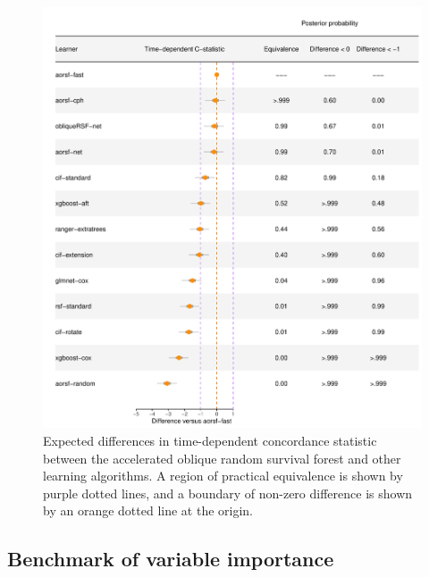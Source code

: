 \documentclass[twoside,11pt]{article}\usepackage[]{graphicx}\usepackage[]{xcolor}
\makeatletter
\def\maxwidth{ %
  \ifdim\Gin@nat@width>\linewidth
    \linewidth
  \else
    \Gin@nat@width
  \fi
}
\newenvironment{knitrout}{}{} %
\makeatother
\begin{document}
\begin{knitrout}
\color{fgcolor}\begin{figure}
\includegraphics[width=\maxwidth]{figure/bm_pred_model_viz_cstat-1} \caption[Expected differences in time-dependent concordance statistic between the accelerated oblique random survival forest and other learning algorithms]{Expected differences in time-dependent concordance statistic between the accelerated oblique random survival forest and other learning algorithms. A region of practical equivalence is shown by purple dotted lines, and a boundary of non-zero difference is shown by an orange dotted line at the origin.}\label{fig:bm_pred_model_viz_cstat}
\end{figure}

\end{knitrout}

\subsection{Benchmark of variable importance} \label{sec:bm_vi}
\end{document}
